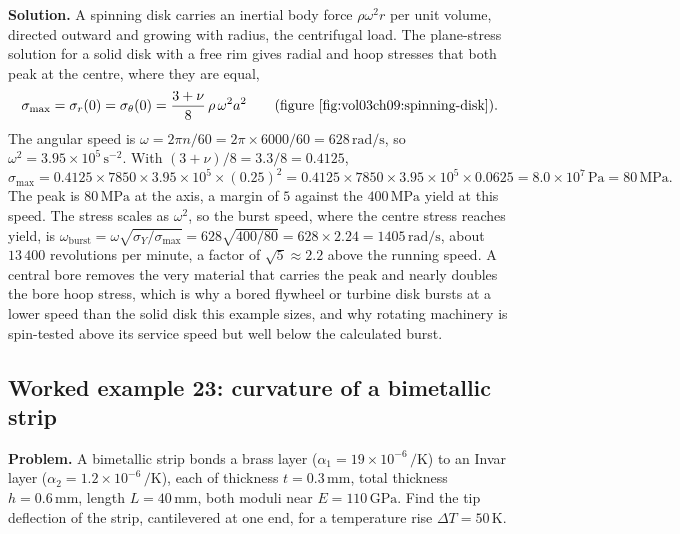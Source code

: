 \textbf{Solution.} A spinning disk carries an inertial body force
$\rho\omega^2 r$ per unit volume, directed outward and growing with radius,
the centrifugal load. The plane-stress solution for a solid disk with a
free rim gives radial and hoop stresses that both peak at the centre, where
they are equal,
\[
\sigma_{\max} = \sigma_r(0) = \sigma_\theta(0)
= \frac{3+\nu}{8}\,\rho\,\omega^2 a^2
\qquad(\text{figure~\ref{fig:vol03ch09:spinning-disk}}).
\]
The angular speed is $\omega = 2\pi n/60 = 2\pi\times 6000/60 = 628\,
\text{rad/s}$, so $\omega^2 = 3.95\times 10^5\,\text{s}^{-2}$. With
$(3+\nu)/8 = 3.3/8 = 0.4125$,
\[
\sigma_{\max} = 0.4125\times 7850\times 3.95\times 10^5\times (0.25)^2
= 0.4125\times 7850\times 3.95\times 10^5\times 0.0625
= 8.0\times 10^{7}\,\text{Pa} = 80\,\text{MPa}.
\]
The peak is $80\,\text{MPa}$ at the axis, a margin of $5$ against the
$400\,\text{MPa}$ yield at this speed. The stress scales as $\omega^2$, so
the burst speed, where the centre stress reaches yield, is $\omega_{\text{
burst}} = \omega\sqrt{\sigma_Y/\sigma_{\max}} = 628\sqrt{400/80} = 628\times
2.24 = 1405\,\text{rad/s}$, about $13\,400$ revolutions per minute, a
factor of $\sqrt 5 \approx 2.2$ above the running speed. A central bore
removes the very material that carries the peak and nearly doubles the bore
hoop stress, which is why a bored flywheel or turbine disk bursts at a lower
speed than the solid disk this example sizes, and why rotating machinery is
spin-tested above its service speed but well below the calculated burst.

\subsection*{Worked example 23: curvature of a bimetallic strip}



\textbf{Problem.} A bimetallic strip bonds a brass layer ($\alpha_1 =
19\times 10^{-6}\,\si{\per\kelvin}$) to an Invar layer ($\alpha_2 = 1.2
\times 10^{-6}\,\si{\per\kelvin}$), each of thickness $t = 0.3\,\si{\milli
\meter}$, total thickness $h = 0.6\,\si{\milli\meter}$, length $L = 40\,
\si{\milli\meter}$, both moduli near $E = 110\,\text{GPa}$. Find the tip
deflection of the strip, cantilevered at one end, for a temperature rise
$\Delta T = 50\,\si{\kelvin}$.

